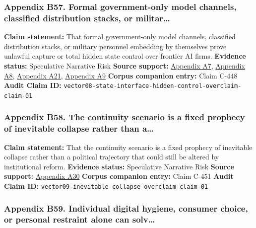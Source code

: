 \documentclass[
  american,
  11pt,
  letterpaper,
]{article}
\begin{document}
\subsubsection{Appendix B57. Formal government-only model channels,
classified distribution stacks, or
militar\ldots{}}\label{ch-10-appendix-b57-formal-government-only-model-channels-classified-distribution-stacks-or-militar}

\textbf{Claim statement:} That formal government-only model channels,
classified distribution stacks, or military personnel embedding by
themselves prove unlawful capture or total hidden state control over
frontier AI firms. \textbf{Evidence status:} Speculative Narrative Risk
\textbf{Source support:}
\hyperref[ch-10-appendix-a7-introducing-openai-for-government]{Appendix
A7},
\hyperref[ch-10-appendix-a8-claude-gov-models-for-u-s-national-security-customers]{Appendix
A8},
\hyperref[ch-10-appendix-a21-anthropic-and-palantir-partner-to-bring-claude-ai-models-to-aws-for-u-s-government-intelligence-and-defense-operations]{Appendix
A21},
\hyperref[ch-10-appendix-a9-army-launches-detachment-201-executive-innovation-corps-to-drive-tech-transformation]{Appendix
A9} \textbf{Corpus companion entry:} Claim C-448 \textbf{Audit Claim
ID:} \texttt{vector08-state-interface-hidden-control-overclaim-claim-01}

\subsubsection{Appendix B58. The continuity scenario is a fixed prophecy
of inevitable collapse rather than
a\ldots{}}\label{ch-10-appendix-b58-the-continuity-scenario-is-a-fixed-prophecy-of-inevitable-collapse-rather-than-a}

\textbf{Claim statement:} That the continuity scenario is a fixed
prophecy of inevitable collapse rather than a political trajectory that
could still be altered by institutional reform. \textbf{Evidence
status:} Speculative Narrative Risk \textbf{Source support:}
\hyperref[ch-10-appendix-a30-encyclical-letter-of-his-holiness-leo-xiv-magnifica-humanitas]{Appendix
A30} \textbf{Corpus companion entry:} Claim C-451 \textbf{Audit Claim
ID:} \texttt{vector09-inevitable-collapse-overclaim-claim-01}

\subsubsection{Appendix B59. Individual digital hygiene, consumer
choice, or personal restraint alone can
solv\ldots{}}\label{ch-10-appendix-b59-individual-digital-hygiene-consumer-choice-or-personal-restraint-alone-can-solv}
\end{document}

